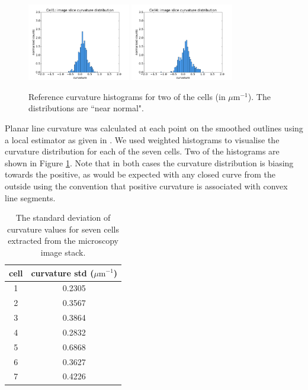 \documentclass[a4paper,10pt]{article}
\begin{document}
\begin{figure}[H]
\begin{center}
\includegraphics[width=0.4\textwidth]{images/cell1_curv.pdf}
\includegraphics[width=0.4\textwidth]{images/cell4_curv.pdf}
\end{center}
\caption{Reference curvature histograms for two of the cells (in $\mu \text{m}^{-1}$). The distributions are ``near normal".}
\label{fig:ref_histogram}
\end{figure}

Planar line curvature was calculated at each point on the smoothed outlines using a local estimator as given in \cite{Rugis_2008_DSC}. We used weighted histograms to visualise the curvature distribution for each of the seven cells. Two of the histograms are shown in Figure \ref{fig:ref_histogram}. Note that in both cases the curvature distribution is biasing towards the positive, as would be expected with any closed curve from the outside using the convention that positive curvature is associated with convex line segments.\\

\begin{table}[H]
\begin{center}
\footnotesize
\begin{tabular}{|c|c|}
\hline
cell &curvature std ($\mu \text{m}^{-1}$) \\
\hline
1 &0.2305\\
2 &0.3567\\
3 & 0.3864\\
4 &0.2832\\
5 &0.6868\\
6 &0.3627\\
7 & 0.4226\\
\hline
\end{tabular}
\end{center}
\caption{The standard deviation of curvature values for seven cells extracted from the microscopy image stack.}
\label{tab:ref_curv}
\end{table}
\end{document}
